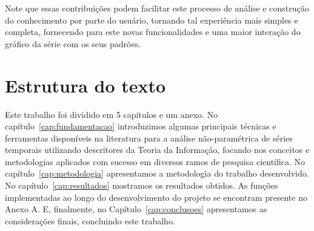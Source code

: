 Note que essas contribuições podem facilitar este processo de análise e construção do conhecimento por parte do usuário, tornando tal experiência mais simples e completa, fornecendo para este novas funcionalidades e uma maior interação do gráfico da série com os seus padrões.

\section{Estrutura do texto}

Este trabalho foi dividido em 5 capítulos e um anexo. 
No capítulo~\ref{cap:fundamentacao} introduzimos algumas principais técnicas e ferramentas disponíveis na literatura para a análise não-paramétrica de séries temporais utilizando descritores da Teoria da Informação, focando nos conceitos e metodologias aplicados com sucesso em diversos ramos de pesquisa científica.
No capítulo~\ref{cap:metodologia} apresentamos a metodologia do trabalho desenvolvido.
No capítulo~\ref{cap:resultados} mostramos os resultados obtidos.
As funções implementadas ao longo do desenvolvimento do projeto se encontram presente no Anexo A.
E, finalmente, no Capítulo~\ref{cap:conclusoes} apresentamos as considerações finais, concluindo este trabalho.

\newpage\lhead{\rightmark}
